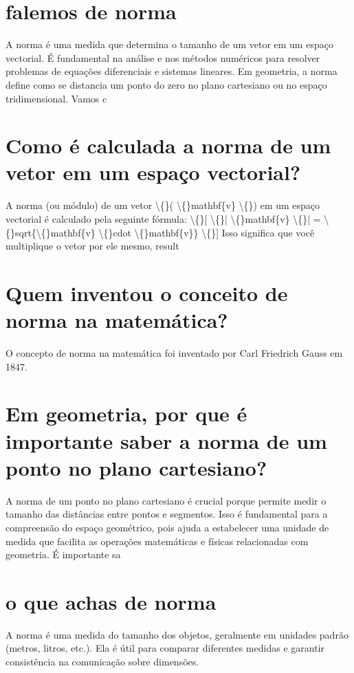 \documentclass[11pt,a4paper]{article}
\begin{document}
\section{falemos de norma}
A norma é uma medida que determina o tamanho de um vetor em um espaço vectorial. É fundamental na análise e nos métodos numéricos para resolver problemas de equações diferenciais e sistemas lineares. Em geometria, a norma define como se distancia um ponto do zero no plano cartesiano ou no espaço tridimensional. Vamos c

\section{Como é calculada a norma de um vetor em um espaço vectorial?}
A norma (ou módulo) de um vetor \textbackslash\{\}( \textbackslash\{\}mathbf\{v\} \textbackslash\{\}) em um espaço vectorial é calculado pela seguinte fórmula: \textbackslash\{\}[ \textbackslash\{\}| \textbackslash\{\}mathbf\{v\} \textbackslash\{\}| = \textbackslash\{\}sqrt\{\textbackslash\{\}mathbf\{v\} \textbackslash\{\}cdot \textbackslash\{\}mathbf\{v\}\} \textbackslash\{\}] Isso significa que você multiplique o vetor por ele mesmo, result

\section{Quem inventou o conceito de norma na matemática?}
O concepto de norma na matemática foi inventado por Carl Friedrich Gauss em 1847.

\section{Em geometria, por que é importante saber a norma de um ponto no plano cartesiano?}
A norma de um ponto no plano cartesiano é crucial porque permite medir o tamanho das distâncias entre pontos e segmentos. Isso é fundamental para a compreensão do espaço geométrico, pois ajuda a estabelecer uma unidade de medida que facilita as operações matemáticas e físicas relacionadas com geometria. É importante sa

\section{o que achas de norma}
A norma é uma medida do tamanho dos objetos, geralmente em unidades padrão (metros, litros, etc.). Ela é útil para comparar diferentes medidas e garantir consistência na comunicação sobre dimensões.
\end{document}

